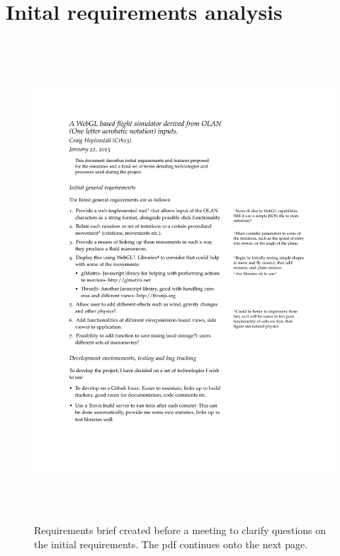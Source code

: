 \section{Inital requirements analysis}
\label{app:init}
\begin{figure}[h!]
	\caption{Requirements brief created before a meeting to clarify questions on the initial requirements. The pdf continues onto the next page.}
	\includegraphics[width=18cm,height=18cm,page=1]{images/init.pdf}
\end{figure}

